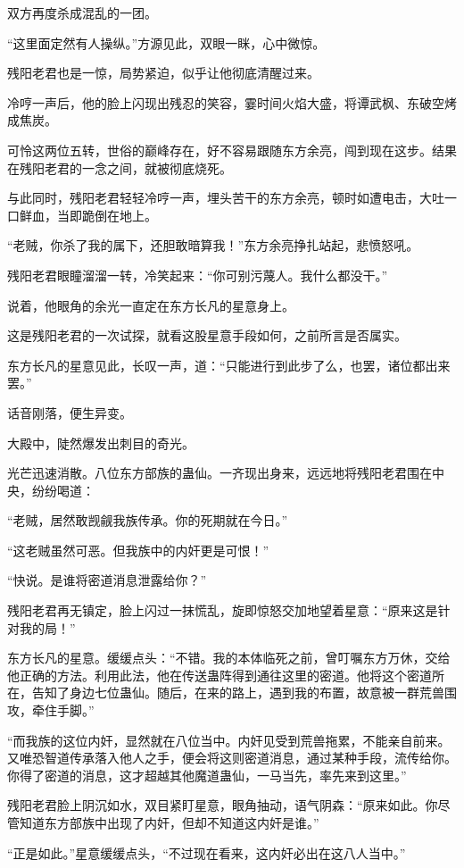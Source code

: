 \begin{this_body}
双方再度杀成混乱的一团。

“这里面定然有人操纵。”方源见此，双眼一眯，心中微惊。

残阳老君也是一惊，局势紧迫，似乎让他彻底清醒过来。

冷哼一声后，他的脸上闪现出残忍的笑容，霎时间火焰大盛，将谭武枫、东破空烤成焦炭。

可怜这两位五转，世俗的巅峰存在，好不容易跟随东方余亮，闯到现在这步。结果在残阳老君的一念之间，就被彻底烧死。

与此同时，残阳老君轻轻冷哼一声，埋头苦干的东方余亮，顿时如遭电击，大吐一口鲜血，当即跪倒在地上。

“老贼，你杀了我的属下，还胆敢暗算我！”东方余亮挣扎站起，悲愤怒吼。

残阳老君眼瞳溜溜一转，冷笑起来：“你可别污蔑人。我什么都没干。”

说着，他眼角的余光一直定在东方长凡的星意身上。

这是残阳老君的一次试探，就看这股星意手段如何，之前所言是否属实。

东方长凡的星意见此，长叹一声，道：“只能进行到此步了么，也罢，诸位都出来罢。”

话音刚落，便生异变。

大殿中，陡然爆发出刺目的奇光。

光芒迅速消散。八位东方部族的蛊仙。一齐现出身来，远远地将残阳老君围在中央，纷纷喝道：

“老贼，居然敢觊觎我族传承。你的死期就在今日。”

“这老贼虽然可恶。但我族中的内奸更是可恨！”

“快说。是谁将密道消息泄露给你？”

残阳老君再无镇定，脸上闪过一抹慌乱，旋即惊怒交加地望着星意：“原来这是针对我的局！”

东方长凡的星意。缓缓点头：“不错。我的本体临死之前，曾叮嘱东方万休，交给他正确的方法。利用此法，他在传送蛊阵得到通往这里的密道。他将这个密道所在，告知了身边七位蛊仙。随后，在来的路上，遇到我的布置，故意被一群荒兽围攻，牵住手脚。”

“而我族的这位内奸，显然就在八位当中。内奸见受到荒兽拖累，不能亲自前来。又唯恐智道传承落入他人之手，便会将这则密道消息，通过某种手段，流传给你。你得了密道的消息，这才超越其他魔道蛊仙，一马当先，率先来到这里。”

残阳老君脸上阴沉如水，双目紧盯星意，眼角抽动，语气阴森：“原来如此。你尽管知道东方部族中出现了内奸，但却不知道这内奸是谁。”

“正是如此。”星意缓缓点头，“不过现在看来，这内奸必出在这八人当中。”


\end{this_body}
